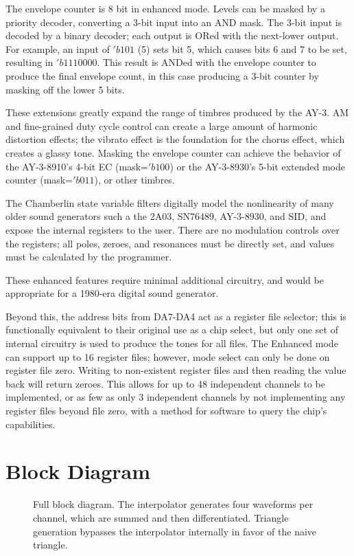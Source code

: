 The envelope counter is 8 bit in enhanced mode.  Levels can be masked by a priority decoder, converting a 3-bit input into an AND mask.  The 3-bit input is decoded by a binary decoder; each output is ORed with the next-lower output.  For example, an input of $'b101$ (5) sets bit 5, which causes bits 6 and 7 to be set, resulting in $'b1110000$.  This result is ANDed with the envelope counter to produce the final envelope count, in this case producing a 3-bit counter by masking off the lower 5 bits.

These extensions greatly expand the range of timbres produced by the AY-3.  AM and fine-grained duty cycle control can create a large amount of harmonic distortion effects; the vibrato effect is the foundation for the chorus effect, which creates a glassy tone.  Masking the envelope counter can achieve the behavior of the AY-3-8910's 4-bit EC (mask=$'b100$) or the AY-3-8930's 5-bit extended mode counter (mask=$'b011$), or other timbres.

The Chamberlin state variable filters digitally model the nonlinearity of many older sound generators such a the 2A03, SN76489, AY-3-8930, and SID, and expose the internal registers to the user.  There are no modulation controls over the registers; all poles, zeroes, and resonances must be directly set, and values must be calculated by the programmer.

These enhanced features require minimal additional circuitry, and would be appropriate for a 1980-era digital sound generator.

Beyond this, the address bits from DA7-DA4 act as a register file selector; this is functionally equivalent to their original use as a chip select, but only one set of internal circuitry is used to produce the tones for all files.  The Enhanced mode can support up to 16 register files; however, mode select can only be done on register file zero.  Writing to non-existent register files and then reading the value back will return zeroes.  This allows for up to 48 independent channels to be implemented, or as few as only 3 independent channels by not implementing any register files beyond file zero, with a method for software to query the chip's capabilities.

\section{Block Diagram}

\begin{figure}[h!t]
    \centering
    
    \caption{\label{fig:block-diagram} Full block diagram.  The interpolator generates four waveforms per channel, which are summed and then differentiated.  Triangle generation bypasses the interpolator internally in favor of the naive triangle.}
\end{figure}

